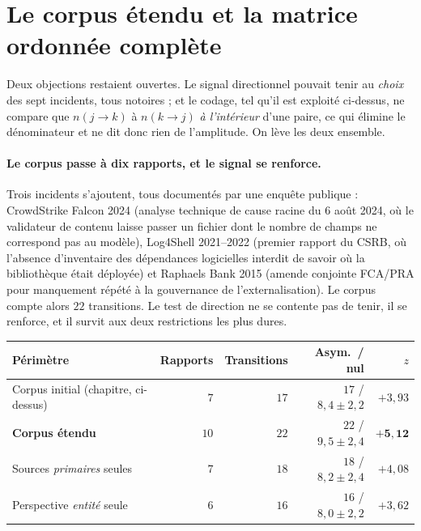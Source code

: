 
\section{Le corpus étendu et la matrice ordonnée complète}

Deux objections restaient ouvertes. Le signal directionnel pouvait tenir au \emph{choix} des
sept incidents, tous notoires ; et le codage, tel qu'il est exploité ci-dessus, ne compare que
$n(j\to k)$ à $n(k\to j)$ \emph{à l'intérieur} d'une paire, ce qui élimine le dénominateur et
ne dit donc rien de l'amplitude. On lève les deux ensemble.

\paragraph{Le corpus passe à dix rapports, et le signal se renforce.} Trois incidents
s'ajoutent, tous documentés par une enquête publique : CrowdStrike Falcon 2024
(analyse technique de cause racine du 6 août 2024, où le validateur de contenu laisse passer un
fichier dont le nombre de champs ne correspond pas au modèle), Log4Shell 2021--2022
(premier rapport du CSRB, où l'absence d'inventaire des dépendances logicielles
interdit de savoir où la bibliothèque était déployée) et Raphaels Bank 2015 (amende
conjointe FCA/PRA pour manquement répété à la gouvernance de
l'externalisation). Le corpus compte alors $22$ transitions. Le test de direction ne se contente
pas de tenir, il se renforce, et il survit aux deux restrictions les plus dures.

\begin{center}\small
\renewcommand{\arraystretch}{1.25}
\begin{tabular}{@{}l r r r r@{}}
\toprule
\textbf{Périmètre} & \textbf{Rapports} & \textbf{Transitions} & \textbf{Asym.\ / nul} & $z$ \\
\midrule
Corpus initial (chapitre, ci-dessus) & $7$ & $17$ & $17$ / $8{,}4\pm2{,}2$ & $+3{,}93$ \\
\textbf{Corpus étendu} & $10$ & $22$ & $22$ / $9{,}5\pm2{,}4$ & $\mathbf{+5{,}12}$ \\
Sources \emph{primaires} seules & $7$ & $18$ & $18$ / $8{,}2\pm2{,}4$ & $+4{,}08$ \\
Perspective \emph{entité} seule & $6$ & $16$ & $16$ / $8{,}0\pm2{,}2$ & $+3{,}62$ \\
\bottomrule
\end{tabular}
\end{center}

